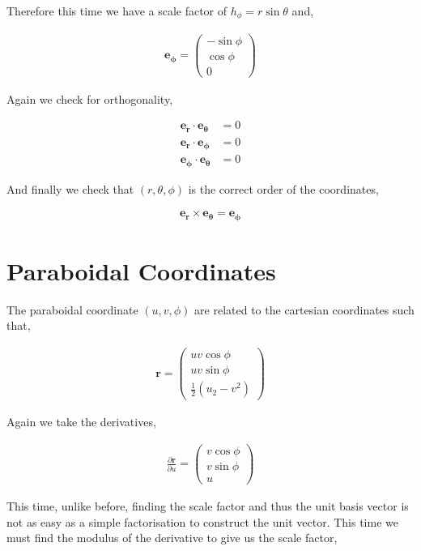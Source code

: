 \documentclass[11pt]{amsart}
\begin{document}
Therefore this time we have a scale factor of $h_{\phi} = r\sin\theta$ and,

\begin{align*}
  \mathbf{e_{\phi}} =
  \begin{pmatrix}
    -\sin\phi \\
    \cos\phi \\
    0
  \end{pmatrix}
\end{align*}

Again we check for orthogonality,

\begin{align*}
  \mathbf{e_r}\cdot\mathbf{e_{\theta}} &= 0 \\
  \mathbf{e_r}\cdot\mathbf{e_{\phi}} &= 0 \\
  \mathbf{e_{\phi}}\cdot\mathbf{e_{\theta}} &= 0
\end{align*}

And finally we check that $(r, \theta, \phi)$ is the correct order of the coordinates,

\begin{align*}
  \mathbf{e_r}\times\mathbf{e_{\theta}}=\mathbf{e_{\phi}}
\end{align*}

\section{Paraboidal Coordinates}

The paraboidal coordinate $(u, v, \phi)$ are related to the cartesian coordinates such that,

\begin{align*}
  \mathbf{r}=
  \begin{pmatrix}
    uv\cos\phi \\
    uv\sin\phi \\
    \frac{1}{2}\left(u_2 - v^2\right)
  \end{pmatrix}
\end{align*}

Again we take the derivatives,

\begin{align*}
  \frac{\partial\mathbf{r}}{\partial u} =
  \begin{pmatrix}
    v\cos\phi \\
    v\sin\phi \\
    u
  \end{pmatrix}
\end{align*}

This time, unlike before, finding the scale factor and thus the unit basis vector is not as easy as a simple factorisation to construct the unit vector. This time we must find the modulus of the derivative to give us the scale factor,
\end{document}
